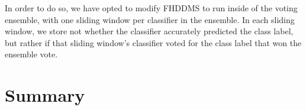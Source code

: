 In order to do so, we have opted to modify FHDDMS to run inside of the voting ensemble, with one sliding window per classifier in the ensemble. In each sliding window, we store not whether the classifier accurately predicted the class label, but rather if that sliding window's classifier voted for the class label that won the ensemble vote.


\section{Summary}

